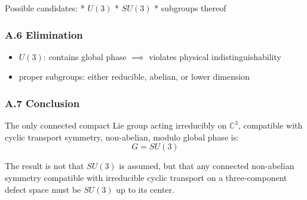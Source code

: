 \documentclass[
]{article}
\providecommand{\tightlist}{%
  \setlength{\itemsep}{0pt}\setlength{\parskip}{0pt}}
\begin{document}
Possible candidates: * \(U(3)\) * \(SU(3)\) * subgroups thereof

\hypertarget{a.6-elimination}{%
\subsubsection{A.6 Elimination}\label{a.6-elimination}}

\begin{itemize}
\tightlist
\item
  \(U(3)\): contains global phase \(\implies\) violates physical
  indistinguishability
\item
  proper subgroups: either reducible, abelian, or lower dimension
\end{itemize}

\hypertarget{a.7-conclusion}{%
\subsubsection{A.7 Conclusion}\label{a.7-conclusion}}

The only connected compact Lie group acting irreducibly on
\(\mathbb{C}^3\), compatible with cyclic transport symmetry,
non-abelian, modulo global phase is: \[G = SU(3)\]

The result is not that \(SU(3)\) is assumed, but that any connected
non-abelian symmetry compatible with irreducible cyclic transport on a
three-component defect space must be \(SU(3)\) up to its center.
\end{document}
